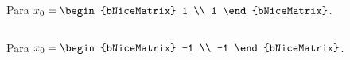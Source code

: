 \begin{frame}[fragile]
	Para
	\begin{math}
		x_{0}=
		\begin{bNiceMatrix}
			1 \\
			1
		\end{bNiceMatrix}
	\end{math}.
	\begin{center}
		\begin{minipage}{0.5\textwidth}
			\inputminted[fontsize=\tiny,firstline=1,lastline=17]{text}{resultado_pregunta_2.txt}
		\end{minipage}
	\end{center}

	Para
	\begin{math}
		x_{0}=
		\begin{bNiceMatrix}
			-1 \\
			-1
		\end{bNiceMatrix}
	\end{math}.
	\begin{center}
		\begin{minipage}{0.5\textwidth}
			\inputminted[fontsize=\tiny,firstline=18,lastline=35]{text}{resultado_pregunta_2.txt}
		\end{minipage}
	\end{center}
\end{frame}

